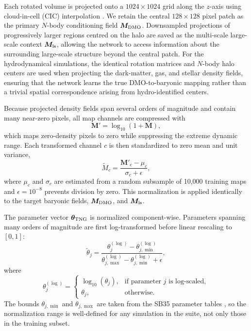 \documentclass[linenumbers,trackchanges, twocolumn]{aastex701}
\begin{document}
Each rotated volume is projected onto a $1024\times1024$ grid along
the $z$-axis using cloud-in-cell (CIC) interpolation
\citep{hockney1988cic}. We retain the central $128\times128$ pixel
patch as the primary $N$-body conditioning field $\bm{M}_{\rm DMO}$.
Downsampled projections of progressively larger regions centred on the
halo are saved as the multi-scale large-scale context $\bm{M}_{\rm
ls}$, allowing the network to access information about the surrounding
large-scale structure beyond the central patch. For the hydrodynamical
simulations, the identical rotation matrices and $N$-body halo centers
are used when projecting the dark-matter, gas, and stellar density
fields, ensuring that the network learns the true DMO-to-baryonic
mapping rather than a trivial spatial correspondence arising from
hydro-identified centers.

Because projected density fields span several orders of magnitude and
contain many near-zero pixels, all map channels are compressed with
\begin{equation}
    \bm{M}' = \log_{10}(1 + \bm{M}),
    \label{eq:logtransform}
\end{equation}
which maps zero-density pixels to zero while suppressing the extreme
dynamic range. Each transformed channel $c$ is then standardized to
zero mean and unit variance,
\begin{equation}
    \tilde{M}_c
    = \frac{\bm{M}'_c - \mu_c}{\sigma_c + \epsilon},
    \label{eq:zscore}
\end{equation}
where $\mu_c$ and $\sigma_c$ are estimated from a random subsample of
10{,}000 training maps and $\epsilon = 10^{-8}$ prevents division by
zero. This normalization is applied identically to the target baryonic
fields, $\bm{M}_{\rm DMO}$, and $\bm{M}_{\rm ls}$.

The parameter vector $\boldsymbol{\theta}_{\rm TNG}$ is normalized
component-wise. Parameters spanning many orders of magnitude are first
log-transformed before linear rescaling to $[0,1]$:
\begin{equation}
    \tilde{\theta}_j
    =
    \frac{\theta_j^{(\log)} - \theta_{j,\min}^{(\log)}}
         {\theta_{j,\max}^{(\log)} - \theta_{j,\min}^{(\log)} + \epsilon},
    \label{eq:paramnorm}
\end{equation}
where
\begin{equation}
    \theta_j^{(\log)}
    =
    \begin{cases}
        \log_{10}(\theta_j), & \text{if parameter } j \text{ is log-scaled},\\
        \theta_j,            & \text{otherwise.}
    \end{cases}
\end{equation}
The bounds $\theta_{j,\min}$ and $\theta_{j,\max}$ are taken from the
SB35 parameter tables \citep{camels_parameters}, so the normalization
range is well-defined for any simulation in the suite, not only those
in the training subset.
\end{document}
